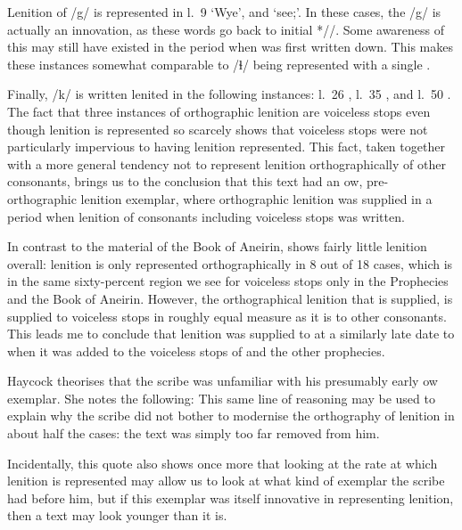 Lenition of /g/ is represented in l.~9  `Wye', and  `see;'. In these cases, the /g/ is actually an innovation, as these words go back to initial */\cw/. Some awareness of this may still have existed in the period when  was first written down. This makes these instances somewhat comparable to /ɬ/ being represented with a single .

Finally, /k/ is written lenited in the following instances: l.~26 , l.~35 , and l.~50 . The fact that three instances of orthographic lenition are voiceless stops even though lenition is represented so scarcely shows that voiceless stops were not particularly impervious to having lenition represented. This fact, taken together with a more general tendency not to represent lenition orthographically of other consonants, brings us to the conclusion that this text had an \gls{ow}, pre-orthographic lenition exemplar, where orthographic lenition was supplied in a period when lenition of consonants including voiceless stops was written. 

In contrast to the material of the Book of Aneirin,  shows fairly little lenition overall: lenition is only represented orthographically in 8 out of 18 cases, which is in the same sixty-percent region we see for voiceless stops only in the Prophecies and the Book of Aneirin. However, the orthographical lenition that is supplied, is supplied to voiceless stops in roughly equal measure as it is to other consonants. This leads me to conclude that lenition was supplied to  at a similarly late date to when it was added to the voiceless stops of  and the other prophecies.

Haycock theorises that the scribe was unfamiliar with his presumably early \gls{ow} exemplar. She notes the following: 
This same line of reasoning may be used to explain why the scribe did not bother to modernise the orthography of lenition in about half the cases: the text was simply too far removed from him. 

Incidentally, this quote also shows once more that looking at the rate at which lenition is represented may allow us to look at what kind of exemplar the scribe had before him, but if this exemplar was itself innovative in representing lenition, then a text may look younger than it is. 

